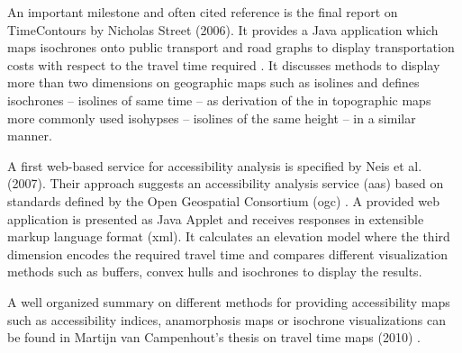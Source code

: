     An important milestone and often cited reference is the final report on
    TimeContours by Nicholas Street (2006). It provides a Java application which
    maps isochrones onto public transport and road graphs to display
    transportation costs with respect to the travel time required
    \cite{street2006timecontours}. It discusses methods to display more than two
    dimensions on geographic maps such as isolines and defines isochrones --
    isolines of same time -- as derivation of the in topographic maps more
    commonly used isohypses -- isolines of the same height -- in a similar
    manner.\par


    A first web-based service for accessibility analysis is specified by
    Neis et al. (2007). Their approach suggests an accessibility analysis
    service (\acrshort{aas}) based on standards defined by the Open Geospatial
    Consortium (\acrshort{ogc}) \cite{neis2007webbasierte}. A provided web
    application is presented as Java Applet and receives responses in extensible
    markup language format (\acrshort{xml}). It calculates an elevation model
    where the third dimension encodes the required travel time and compares
    different visualization methods such as buffers, convex hulls and isochrones
    to display the results.\par

    A well organized summary on different methods for providing accessibility
    maps such as accessibility indices, anamorphosis maps or isochrone
    visualizations can be found in Martijn van Campenhout's thesis on travel
    time maps (2010) \cite{van2010travel}.\par



